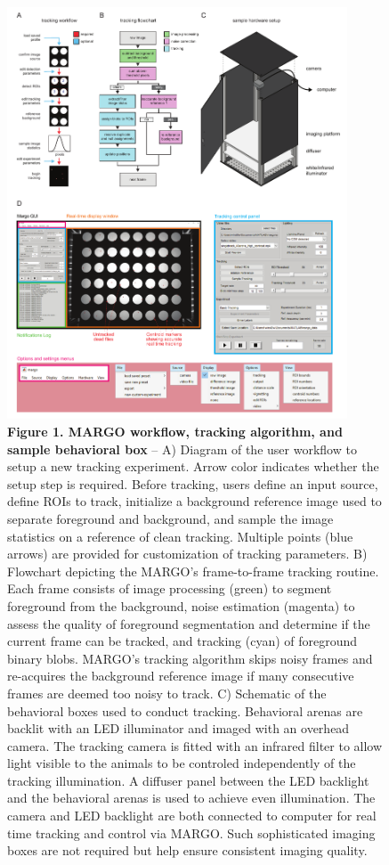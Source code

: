 \documentclass[10pt]{article}
\begin{document}
\newpage
\begin{figure}[h!]
	\begin{center}
		\includegraphics[width=0.9\textwidth]{../figures/autotracker_overview.pdf}
	\end{center}
	\caption*{\footnotesize \textbf{Figure 1. MARGO workflow, tracking algorithm, and sample behavioral box} -- A) Diagram of the user workflow to setup a new tracking experiment. Arrow color indicates whether the setup step is required. Before tracking, users define an input source, define ROIs to track, initialize a background reference image used to separate foreground and background, and sample the image statistics on a reference of clean tracking. Multiple points (blue arrows) are provided for customization of tracking parameters. B) Flowchart depicting the MARGO's frame-to-frame tracking routine. Each frame consists of image processing (green) to segment foreground from the background, noise estimation (magenta) to assess the quality of foreground segmentation and determine if the current frame can be tracked, and tracking (cyan) of foreground binary blobs. MARGO's tracking algorithm skips noisy frames and re-acquires the background reference image if many consecutive frames are deemed too noisy to track. C) Schematic of the behavioral boxes used to conduct tracking. Behavioral arenas are backlit with an LED illuminator and imaged with an overhead camera. The tracking camera is fitted with an infrared filter to allow light visible to the animals to be controled independently of the tracking illumination. A diffuser panel between the LED backlight and the behavioral arenas is used to achieve even illumination. The camera and LED backlight are both connected to computer for real time tracking and control via MARGO. Such sophisticated imaging boxes are not required but help ensure consistent imaging quality.}
\end{figure}
\end{document}
